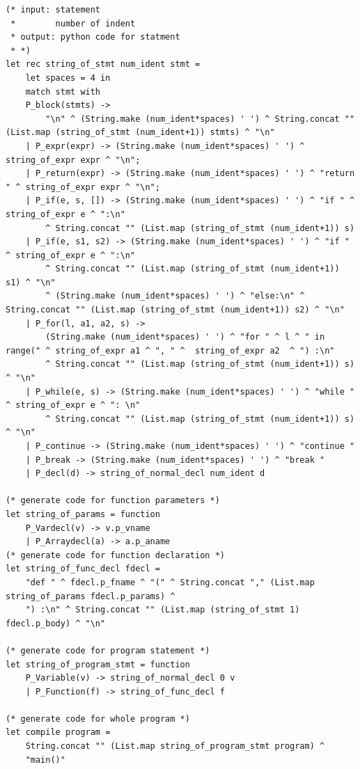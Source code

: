 \documentclass[12pt]{article} %
\begin{document}
\begin{lstlisting}[style=appendix, caption=compile.ml]
(* input: statement
 *        number of indent
 * output: python code for statment
 * *)
let rec string_of_stmt num_ident stmt = 
    let spaces = 4 in 
    match stmt with 
    P_block(stmts) ->
        "\n" ^ (String.make (num_ident*spaces) ' ') ^ String.concat "" (List.map (string_of_stmt (num_ident+1)) stmts) ^ "\n"
    | P_expr(expr) -> (String.make (num_ident*spaces) ' ') ^ string_of_expr expr ^ "\n";
    | P_return(expr) -> (String.make (num_ident*spaces) ' ') ^ "return " ^ string_of_expr expr ^ "\n";
    | P_if(e, s, []) -> (String.make (num_ident*spaces) ' ') ^ "if " ^ string_of_expr e ^ ":\n" 
        ^ String.concat "" (List.map (string_of_stmt (num_ident+1)) s)
    | P_if(e, s1, s2) -> (String.make (num_ident*spaces) ' ') ^ "if " ^ string_of_expr e ^ ":\n"
        ^ String.concat "" (List.map (string_of_stmt (num_ident+1)) s1) ^ "\n" 
        ^ (String.make (num_ident*spaces) ' ') ^ "else:\n" ^ String.concat "" (List.map (string_of_stmt (num_ident+1)) s2) ^ "\n"
    | P_for(l, a1, a2, s) ->
        (String.make (num_ident*spaces) ' ') ^ "for " ^ l ^ " in range(" ^ string_of_expr a1 ^ ", " ^  string_of_expr a2  ^ ") :\n" 
        ^ String.concat "" (List.map (string_of_stmt (num_ident+1)) s) ^ "\n"
    | P_while(e, s) -> (String.make (num_ident*spaces) ' ') ^ "while " ^ string_of_expr e ^ ": \n" 
        ^ String.concat "" (List.map (string_of_stmt (num_ident+1)) s) ^ "\n"
    | P_continue -> (String.make (num_ident*spaces) ' ') ^ "continue "
    | P_break -> (String.make (num_ident*spaces) ' ') ^ "break "
    | P_decl(d) -> string_of_normal_decl num_ident d

(* generate code for function parameters *)
let string_of_params = function
    P_Vardecl(v) -> v.p_vname
    | P_Arraydecl(a) -> a.p_aname
(* generate code for function declaration *)
let string_of_func_decl fdecl =
    "def " ^ fdecl.p_fname ^ "(" ^ String.concat "," (List.map string_of_params fdecl.p_params) ^  
    ") :\n" ^ String.concat "" (List.map (string_of_stmt 1) fdecl.p_body) ^ "\n"

(* generate code for program statement *)
let string_of_program_stmt = function
    P_Variable(v) -> string_of_normal_decl 0 v
    | P_Function(f) -> string_of_func_decl f

(* generate code for whole program *)
let compile program = 
    String.concat "" (List.map string_of_program_stmt program) ^
    "main()"
\end{lstlisting}
\end{document}
